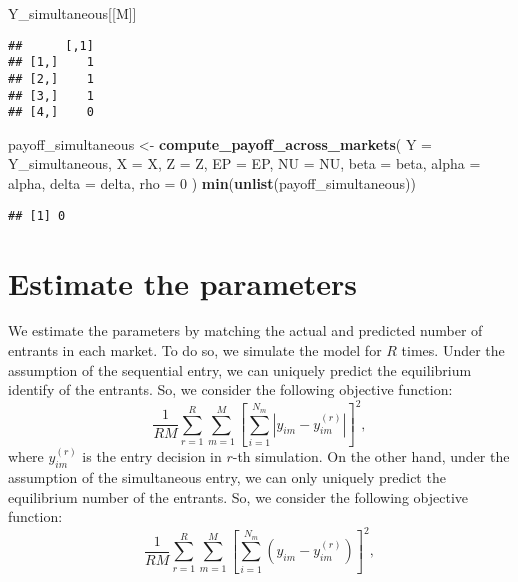\documentclass[
]{book}
\newenvironment{Shaded}{\begin{snugshade}}{\end{snugshade}}
\newcommand{\AttributeTok}[1]{\textcolor[rgb]{0.13,0.29,0.53}{#1}}
\newcommand{\DecValTok}[1]{\textcolor[rgb]{0.00,0.00,0.81}{#1}}
\newcommand{\FunctionTok}[1]{\textcolor[rgb]{0.13,0.29,0.53}{\textbf{#1}}}
\newcommand{\NormalTok}[1]{#1}
\newcommand{\OtherTok}[1]{\textcolor[rgb]{0.56,0.35,0.01}{#1}}
\begin{document}
\begin{Shaded}
\begin{Highlighting}[]
\NormalTok{Y\_simultaneous[[M]]}
\end{Highlighting}
\end{Shaded}

\begin{verbatim}
##      [,1]
## [1,]    1
## [2,]    1
## [3,]    1
## [4,]    0
\end{verbatim}

\begin{Shaded}
\begin{Highlighting}[]
\NormalTok{payoff\_simultaneous }\OtherTok{\textless{}{-}}
  \FunctionTok{compute\_payoff\_across\_markets}\NormalTok{(}
    \AttributeTok{Y =}\NormalTok{ Y\_simultaneous, }
    \AttributeTok{X =}\NormalTok{ X, }
    \AttributeTok{Z =}\NormalTok{ Z, }
    \AttributeTok{EP =}\NormalTok{ EP, }
    \AttributeTok{NU =}\NormalTok{ NU, }
    \AttributeTok{beta =}\NormalTok{ beta, }
    \AttributeTok{alpha =}\NormalTok{ alpha, }
    \AttributeTok{delta =}\NormalTok{ delta, }
    \AttributeTok{rho =} \DecValTok{0}
\NormalTok{    )}
\FunctionTok{min}\NormalTok{(}\FunctionTok{unlist}\NormalTok{(payoff\_simultaneous))}
\end{Highlighting}
\end{Shaded}

\begin{verbatim}
## [1] 0
\end{verbatim}

\hypertarget{estimate-the-parameters-4}{%
\section{Estimate the parameters}\label{estimate-the-parameters-4}}

We estimate the parameters by matching the actual and predicted number of entrants in each market. To do so, we simulate the model for \(R\) times.
Under the assumption of the sequential entry, we can uniquely predict the equilibrium identify of the entrants. So, we consider the following objective function:
\[
\frac{1}{RM}\sum_{r = 1}^R \sum_{m = 1}^M \left[\sum_{i = 1}^{N_m}|y_{im} - y_{im}^{(r)}| \right]^2,
\]
where \(y_{im}^{(r)}\) is the entry decision in \(r\)-th simulation. On the other hand, under the assumption of the simultaneous entry, we can only uniquely predict the equilibrium number of the entrants. So, we consider the following objective function:
\[
\frac{1}{RM}\sum_{r = 1}^R \sum_{m = 1}^M \left[\sum_{i = 1}^{N_m}(y_{im} - y_{im}^{(r)}) \right]^2,
\]
\end{document}
